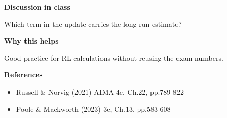 \documentclass[11pt]{article}
\begin{document}
\begin{tcolorbox}[colback=white,colframe=MidnightBlue,title={Q2 RL Update and Interpretation},fonttitle=\bfseries,breakable]
{\large\bfseries\color{MidnightBlue} Discussion in class}\par\medskip
Which term in the update carries the long-run estimate?

{\large\bfseries\color{MidnightBlue} Why this helps}\par\medskip
Good practice for RL calculations without reusing the exam numbers.

{\large\bfseries\color{MidnightBlue} References}\par\medskip
\begin{itemize}\item Russell \& Norvig (2021) AIMA 4e, Ch.22, pp.789-822
\item Poole \& Mackworth (2023) 3e, Ch.13, pp.583-608\end{itemize}
\end{tcolorbox}
\end{document}
